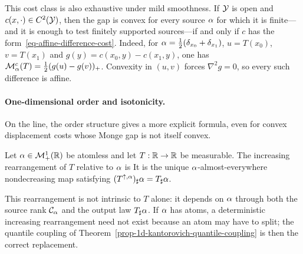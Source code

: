 This cost class is also exhaustive under mild smoothness. If $\mathcal{Y}$ is open and $c(x,\cdot)\in C^2(\mathcal{Y})$, then the gap is convex for every source $\alpha$ for which it is finite---and it is enough to test finitely supported sources---if and only if $c$ has the form~\eqref{eq-affine-difference-cost}. Indeed, for $\alpha=\frac12(\delta_{x_0}+\delta_{x_1})$, $u=T(x_0)$, $v=T(x_1)$ and $g(y)=c(x_0,y)-c(x_1,y)$, one has $\mathcal M_\alpha^c(T)=\frac12(g(u)-g(v))_+$. Convexity in $(u,v)$ forces $\nabla^2g=0$, so every such difference is affine.

\paragraph{One-dimensional order and isotonicity.}

On the line, the order structure gives a more explicit formula, even for convex displacement costs whose Monge gap is not itself convex.

\begin{defn}\label{def-increasing-rearrangement-map}
	Let $\alpha\in\mathcal{M}_+^1(\mathbb{R})$ be atomless and let $T:\mathbb{R}\to\mathbb{R}$ be measurable. The increasing rearrangement of $T$ relative to $\alpha$ is
	It is the unique $\alpha$-almost-everywhere nondecreasing map satisfying $(T^{\uparrow,\alpha})_\sharp\alpha=T_\sharp\alpha$.
\end{defn}

This rearrangement is not intrinsic to $T$ alone: it depends on $\alpha$ through both the source rank $\mathcal{C}_{\alpha}$ and the output law $T_\sharp\alpha$. If $\alpha$ has atoms, a deterministic increasing rearrangement need not exist because an atom may have to split; the quantile coupling of Theorem~\ref{prop-1d-kantorovich-quantile-coupling} is then the correct replacement.

